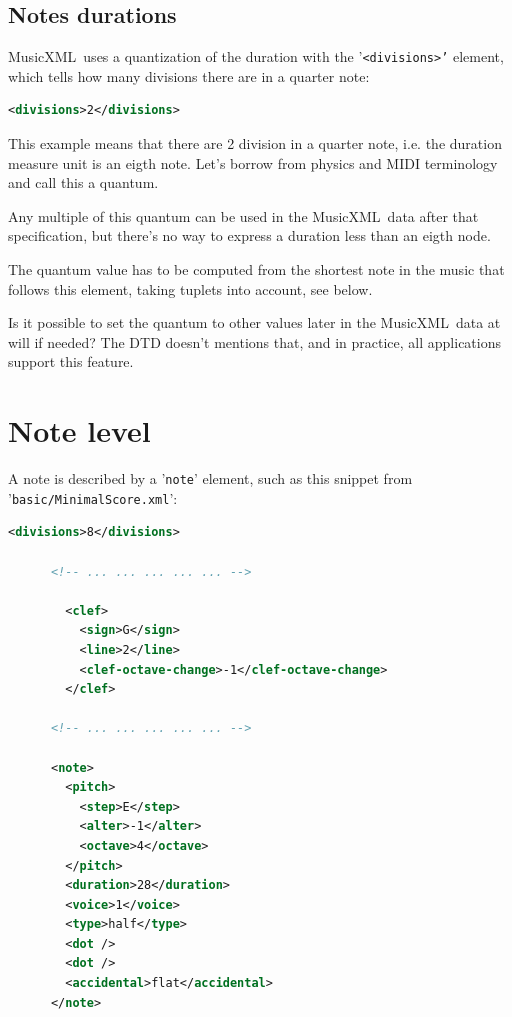 \documentclass[12pt,a4paper]{article}
\newcommand{\mxml}{MusicXML}
\begin{document}
\subsection{Notes durations}

\mxml\ uses a quantization of the duration with the {'\tt <divisions>'} element, which tells how many divisions there are in a quarter note:
\begin{lstlisting}[language=XML]
       <divisions>2</divisions>
\end{lstlisting}

This example means that there are 2 division in a quarter note, i.e. the duration measure unit is an eigth note. Let's borrow from physics and MIDI terminology and call this a quantum.

Any multiple of this quantum can be used in the \mxml\ data after that specification, but there's no way to express a duration less than an eigth node.

The quantum value has to be computed from the shortest note in the music that follows this element, taking tuplets into account, see below. 

Is it possible to set the quantum to other values later in the \mxml\ data at will if needed? The DTD doesn't mentions that, and in practice, all applications support this feature.

\section{Note level}

A note is described by a {'\tt note}' element, such as this snippet from {'\tt basic/MinimalScore.xml}':

\begin{lstlisting}[language=XML, caption =Note example]
        <divisions>8</divisions>
        
      <!-- ... ... ... ... ... -->
      
        <clef>
          <sign>G</sign>
          <line>2</line>
          <clef-octave-change>-1</clef-octave-change>
        </clef>

      <!-- ... ... ... ... ... -->
      
      <note>
        <pitch>
          <step>E</step>
          <alter>-1</alter>
          <octave>4</octave>
        </pitch>
        <duration>28</duration>
        <voice>1</voice>
        <type>half</type>
        <dot />
        <dot />
        <accidental>flat</accidental>
      </note>
\end{lstlisting}
\end{document}
